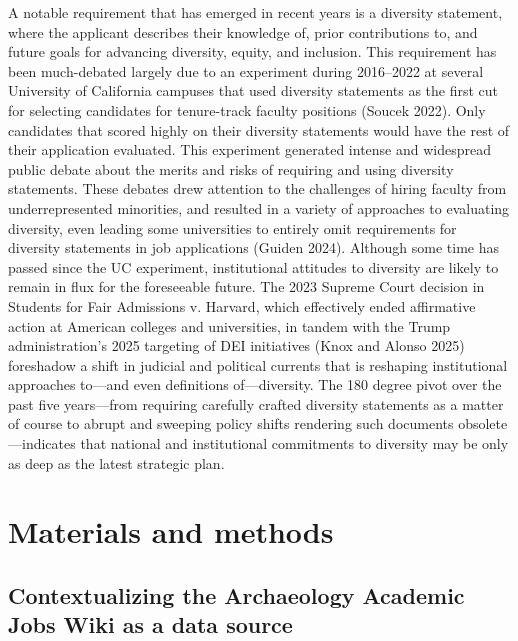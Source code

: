 \documentclass[
  12pt,
]{article}
\begin{document}
A notable requirement that has emerged in recent years is a diversity
statement, where the applicant describes their knowledge of, prior
contributions to, and future goals for advancing diversity, equity, and
inclusion. This requirement has been much-debated largely due to an
experiment during 2016--2022 at several University of California
campuses that used diversity statements as the first cut for selecting
candidates for tenure-track faculty positions (Soucek 2022). Only
candidates that scored highly on their diversity statements would have
the rest of their application evaluated. This experiment generated
intense and widespread public debate about the merits and risks of
requiring and using diversity statements. These debates drew attention
to the challenges of hiring faculty from underrepresented minorities,
and resulted in a variety of approaches to evaluating diversity, even
leading some universities to entirely omit requirements for diversity
statements in job applications (Guiden 2024). Although some time has
passed since the UC experiment, institutional attitudes to diversity are
likely to remain in flux for the foreseeable future. The 2023 Supreme
Court decision in Students for Fair Admissions v. Harvard, which
effectively ended affirmative action at American colleges and
universities, in tandem with the Trump administration's 2025 targeting
of DEI initiatives (Knox and Alonso 2025) foreshadow a shift in judicial
and political currents that is reshaping institutional approaches
to---and even definitions of---diversity. The 180 degree pivot over the
past five years---from requiring carefully crafted diversity statements
as a matter of course to abrupt and sweeping policy shifts rendering
such documents obsolete---indicates that national and institutional
commitments to diversity may be only as deep as the latest strategic
plan.

\section{Materials and methods}\label{materials-and-methods}

\subsection{Contextualizing the Archaeology Academic Jobs Wiki as a data
source}\label{contextualizing-the-archaeology-academic-jobs-wiki-as-a-data-source}
\end{document}
